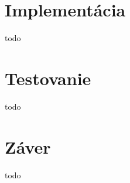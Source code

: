 \chapter{Implementácia}
\label{chap:implementacia}
todo

\chapter{Testovanie}
\label{chap:testovanie}
todo

\chapter{Záver}
\label{chap:zaver}
todo












